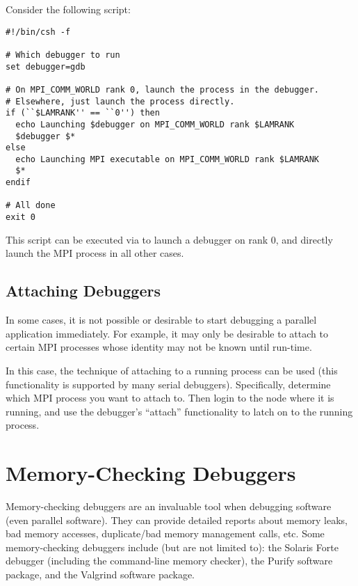 Consider the following script:

\lstset{style=lam-shell}
\begin{lstlisting}
#!/bin/csh -f

# Which debugger to run
set debugger=gdb

# On MPI_COMM_WORLD rank 0, launch the process in the debugger.
# Elsewhere, just launch the process directly.
if (``$LAMRANK'' == ``0'') then
  echo Launching $debugger on MPI_COMM_WORLD rank $LAMRANK
  $debugger $*
else
  echo Launching MPI executable on MPI_COMM_WORLD rank $LAMRANK
  $*
endif

# All done
exit 0
\end{lstlisting}

This script can be executed via  to launch a debugger on
 rank 0, and directly launch the MPI
process in all other cases.


\subsection{Attaching Debuggers}

In some cases, it is not possible or desirable to start debugging a
parallel application immediately.  For example, it may only be
desirable to attach to certain MPI processes whose identity may not be
known until run-time.

In this case, the technique of attaching to a running process can be
used (this functionality is supported by many serial debuggers).
Specifically, determine which MPI process you want to attach to.  Then
login to the node where it is running, and use the debugger's
``attach'' functionality to latch on to the running process.


\section{Memory-Checking Debuggers}
\label{sec:debug-mem}

Memory-checking debuggers are an invaluable tool when debugging
software (even parallel software).  They can provide detailed reports
about memory leaks, bad memory accesses, duplicate/bad memory
management calls, etc.  Some memory-checking debuggers include (but
are not limited to): the Solaris Forte debugger (including the
 command-line memory checker), the Purify software
package, and the Valgrind software package.

